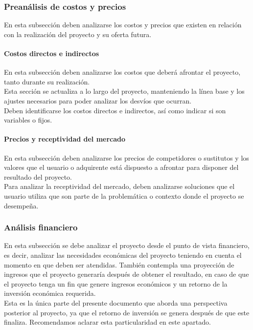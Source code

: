 \newpage

\subsubsection{Preanálisis de costos y precios}
{\consigna
En esta subsección deben analizarse los costos y precios que existen en relación con la realización del proyecto y su oferta futura.
}
    \paragraph{Costos directos e indirectos}
    {\consigna
    En esta subsección deben analizarse los costos que deberá afrontar el proyecto, tanto durante su realización.\\
    Esta sección se actualiza a lo largo del proyecto, manteniendo la línea base y los ajustes necesarios para poder analizar los desvíos que ocurran.\\
    Deben identificarse los costos directos e indirectos, así como indicar si son variables o fijos.
    }
    \paragraph{Precios y receptividad del mercado}
    {\consigna
    En esta subsección deben analizarse los precios de competidores o sustitutos y los valores que el usuario o adquirente está dispuesto a afrontar para disponer del resultado del proyecto.\\
    Para analizar la receptividad del mercado, deben analizarse soluciones que el usuario utiliza que son parte de la problemática o contexto donde el proyecto se desempeña.
   }


\subsubsection{Análisis financiero}
{\consigna
En esta subsección se debe analizar el proyecto desde el punto de vista financiero, es decir, analizar las necesidades económicas del proyecto teniendo en cuenta el momento en que deben ser atendidas. También contempla una proyección de ingresos que el proyecto generaría después de obtener el resultado, en caso de que el proyecto tenga un fin que genere ingresos económicos y un retorno de la inversión económica requerida.\\
Esta es la única parte del presente documento que aborda una perspectiva posterior al proyecto, ya que el retorno de inversión se genera después de que este finaliza. Recomendamos aclarar esta particularidad en este apartado.
}

